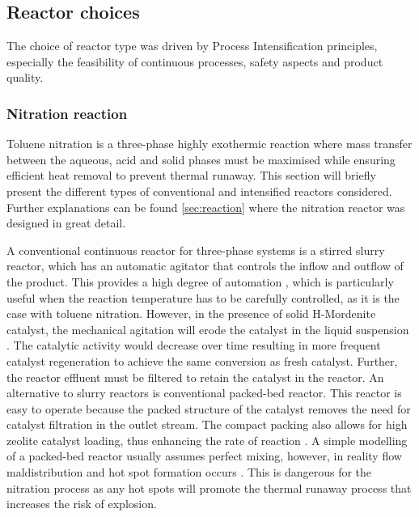 
\subsection{Reactor choices}
\label{sec:reactorchoices}

The choice of reactor type was driven by Process Intensification principles, especially the feasibility of continuous processes, safety aspects and product quality. 

\subsubsection{Nitration reaction} \label{sec:synthesis-R1}

Toluene nitration is a three-phase highly exothermic reaction where mass transfer between the aqueous, acid and solid phases must be maximised while ensuring efficient heat removal to prevent thermal runaway. This section will briefly present the different types of conventional and intensified reactors considered. Further explanations can be found \cref{sec:reaction} where the nitration reactor was designed in great detail.

A conventional continuous reactor for three-phase systems is a stirred slurry reactor, which has an automatic agitator that controls the inflow and outflow of the product. This provides a high degree of automation \cite{liu_nitration_2019}, which is particularly useful when the reaction temperature has to be carefully controlled, as it is the case with toluene nitration. However, in the presence of solid H-Mordenite catalyst, the mechanical agitation will erode the catalyst in the liquid suspension \cite{argyle_heterogeneous_2015}. The catalytic activity would decrease over time resulting in more frequent catalyst regeneration to achieve the same conversion as fresh catalyst. Further, the reactor effluent must be filtered to retain the catalyst in the reactor. 
An alternative to slurry reactors is conventional packed-bed reactor. This reactor is easy to operate because the packed structure of the catalyst removes the need for catalyst filtration in the outlet stream. The compact packing also allows for high zeolite catalyst loading, thus enhancing the rate of reaction \cite{kashid_microstructured_2009}. A simple modelling of a packed-bed reactor usually assumes perfect mixing, however, in reality flow maldistribution and hot spot formation occurs \cite{nguyen_flow_1994}. This is dangerous for the nitration process as any hot spots will promote the thermal runaway process that increases the risk of explosion. 

